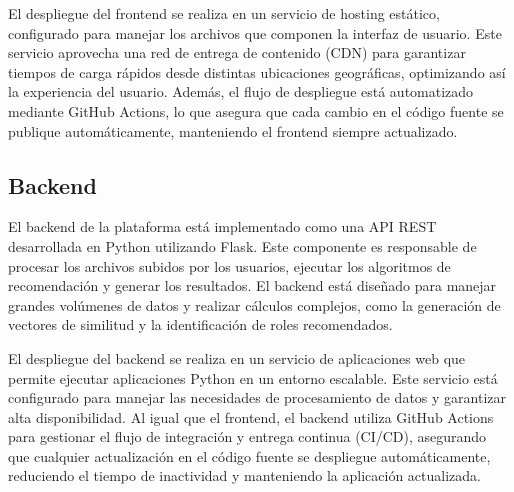 \documentclass[11pt,letterpaper]{article}
\begin{document}
\begin{itemize}
El despliegue del frontend se realiza en un servicio de hosting estático, configurado para manejar los archivos que componen la interfaz de usuario. Este servicio aprovecha una red de entrega de contenido (CDN) para garantizar tiempos de carga rápidos desde distintas ubicaciones geográficas, optimizando así la experiencia del usuario. Además, el flujo de despliegue está automatizado mediante GitHub Actions, lo que asegura que cada cambio en el código fuente se publique automáticamente, manteniendo el frontend siempre actualizado.


\subsection{Backend}
El backend de la plataforma está implementado como una API REST desarrollada en Python utilizando Flask. Este componente es responsable de procesar los archivos subidos por los usuarios, ejecutar los algoritmos de recomendación y generar los resultados. El backend está diseñado para manejar grandes volúmenes de datos y realizar cálculos complejos, como la generación de vectores de similitud y la identificación de roles recomendados.

El despliegue del backend se realiza en un servicio de aplicaciones web que permite ejecutar aplicaciones Python en un entorno escalable. Este servicio está configurado para manejar las necesidades de procesamiento de datos y garantizar alta disponibilidad. Al igual que el frontend, el backend utiliza GitHub Actions para gestionar el flujo de integración y entrega continua (CI/CD), asegurando que cualquier actualización en el código fuente se despliegue automáticamente, reduciendo el tiempo de inactividad y manteniendo la aplicación actualizada.






\end{itemize}
\end{document}
